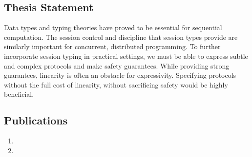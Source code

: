 


\subsection{Thesis Statement}

Data types and typing theories have proved to be essential for sequential computation. The session control and discipline that session types provide are  similarly important for concurrent, distributed programming. To further incorporate session typing in practical settings, we must be able to express subtle and complex protocols and make safety guarantees. While providing strong guarantees, linearity is often an obstacle for expressivity. Specifying protocols without the full cost of linearity, without sacrificing safety would be highly beneficial.


\subsection{Publications}
\begin{enumerate}
   \item {}
   \item {}
 \end{enumerate}
